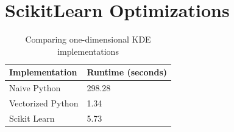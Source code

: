 \documentclass[11pt]{article}
\begin{document}
\section{ScikitLearn Optimizations}



\begin{table}[h!]
\centering
\begin{tabular}{@{}ll@{}}
\toprule
Implementation			& Runtime (seconds)       	\\
\midrule
Naive Python			& 298.28				\\
Vectorized Python		& 1.34				\\
Scikit Learn			& 5.73				\\
\bottomrule
\end{tabular}
\caption{Comparing one-dimensional KDE implementations}
\label{compare_kde}
\end{table}


%


\end{document}
